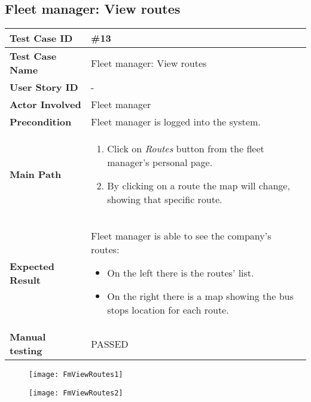 \subsection{Fleet manager: View routes}
\begin{center}
	\begin{tabular} { | m{3.5cm} | m{9.5cm} | }
		\hline
		\textbf{Test Case ID} & \#13\\
		\hline
		\textbf{Test Case Name} & Fleet manager: View routes \\
		\hline
		\textbf{User Story ID} & - \\
		\hline
		\textbf{Actor Involved} & Fleet manager\\
		\hline
		\textbf{Precondition} & Fleet manager is logged into the system.\\
		\hline
		\textbf{Main Path} & 
		\begin{enumerate}
			\item Click on \textit{Routes} button from the fleet manager's personal page.
			\item By clicking on a route the map will change, showing that specific route.
		\end{enumerate}\\
		\hline
		\textbf{Expected Result} & Fleet manager is able to see the company's routes:
		\begin{itemize}
			\item On the left there is the routes' list.
			\item On the right there is a map showing the bus stops location for each route. 
		\end{itemize}\\
		\hline
	\textbf{Manual testing} & PASSED\\
	\hline
\end{tabular}
\end{center}
\begin{figure}[H]
\centering
\texttt{[image: FmViewRoutes1]}
\end{figure}
\begin{figure}[H]
\centering
\texttt{[image: FmViewRoutes2]}
\end{figure}
\newpage
